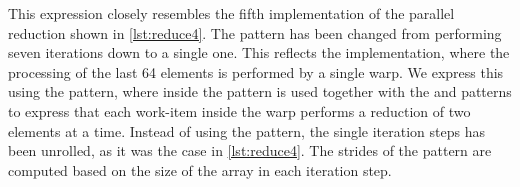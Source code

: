 %
This expression closely resembles the fifth implementation of the parallel reduction shown in \autoref{lst:reduce4}.
The \iterateN pattern has been changed from performing seven iterations down to a single one.
This reflects the \OpenCL implementation, where the processing of the last 64 elements is performed by a single warp.
We express this using the \mapWarp pattern, where inside the \mapLane pattern is used together with the \splitN and \join patterns to express that each work-item inside the warp performs a reduction of two elements at a time.
Instead of using the \iterateN pattern, the single iteration steps has been unrolled, as it was the case in \autoref{lst:reduce4}.
The strides of the \reorderStride pattern are computed based on the size of the array in each iteration step.











